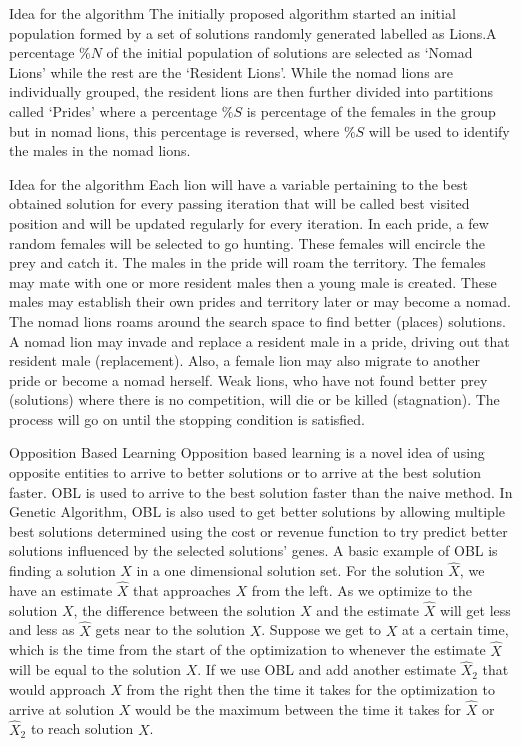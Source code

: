 \documentclass{beamer}
\begin{document}
\begin{frame}{Idea for the algorithm}
The initially proposed algorithm started an initial population formed by a set of solutions randomly generated labelled as Lions.A percentage $\%N$ of the initial population of solutions are selected as `Nomad Lions' while the rest are the `Resident Lions'. While the nomad lions are individually grouped, the resident lions are then further divided into partitions called `Prides' where a percentage $\%S$ is percentage of the females in the group but in nomad lions, this percentage is reversed, where $\%S$ will be used to identify the males in the nomad lions.
\end{frame}
\begin{frame}{Idea for the algorithm}
Each lion will have a variable pertaining to the best obtained solution for every passing iteration that will be called best visited position and will be updated regularly for every iteration. In each pride, a few random females will be selected to go hunting. These females will encircle the prey and catch it. The males in the pride will roam the territory. The females may mate with one or more resident males then a young male is created. These males may establish their own prides and territory later or may become a nomad.
The nomad lions roams around the search space to find better (places) solutions. A nomad lion may invade and replace a resident male in a pride, driving out that resident male (replacement). Also, a female lion may also migrate to another pride or become a nomad herself. Weak lions, who have not found better prey (solutions) where there is no competition, will die or be killed (stagnation). The process will go on until the stopping condition is satisfied.
\end{frame}


\begin{frame}{Opposition Based Learning}
Opposition based learning is a novel idea of using opposite entities to arrive to better solutions or to arrive at the best solution faster. OBL is used to arrive to the best solution faster than the naive method. In Genetic Algorithm, OBL is also used to get better solutions by allowing multiple best solutions determined using the cost or revenue function to try predict better solutions influenced by the selected solutions' genes. A basic example of OBL is finding a solution $X$ in a one dimensional solution set. For the solution $\hat{X}$, we have an estimate $\hat{X}$ that approaches $X$ from the left. As we optimize to the solution $X$, the difference between the solution $X$ and the estimate $\hat{X}$ will get less and less as $\hat{X}$ gets near to the solution $X$. Suppose we get to $X$ at a certain time, which is the time from the start of the optimization to whenever the estimate $\hat{X}$ will be equal to the solution $ X $. If we use OBL and add another estimate $\hat{X}_2$ that would approach $X$ from the right then the time it takes for the optimization to arrive at solution $X$ would be the maximum between the time it takes for $\hat{X}$ or $\hat{X}_2$ to reach solution $X$.
\end{frame}
\end{document}
